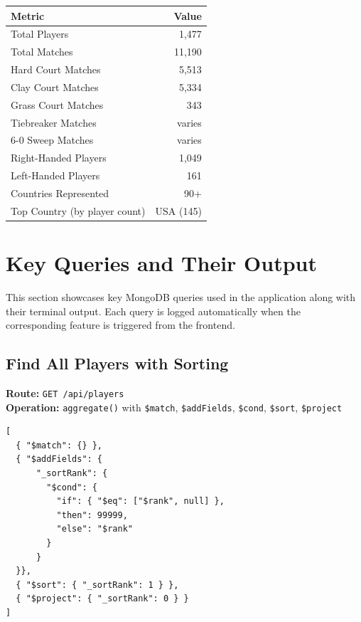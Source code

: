 \documentclass[12pt,a4paper]{article}
\begin{document}
\begin{tabular}{|l|r|}
    \hline
    \textbf{Metric}              & \textbf{Value} \\
    \hline
    Total Players                & 1,477 \\
    \hline
    Total Matches                & 11,190 \\
    \hline
    Hard Court Matches           & 5,513 \\
    \hline
    Clay Court Matches           & 5,334 \\
    \hline
    Grass Court Matches          & 343 \\
    \hline
    Tiebreaker Matches           & varies \\
    \hline
    6-0 Sweep Matches            & varies \\
    \hline
    Right-Handed Players         & 1,049 \\
    \hline
    Left-Handed Players          & 161 \\
    \hline
    Countries Represented        & 90+ \\
    \hline
    Top Country (by player count)& USA (145) \\
    \hline
\end{tabular}


\newpage
\section{Key Queries and Their Output}

This section showcases key MongoDB queries used in the application along with their terminal output. Each query is logged automatically when the corresponding feature is triggered from the frontend.

\subsection{Find All Players with Sorting}
\textbf{Route:} \texttt{GET /api/players} \\
\textbf{Operation:} \texttt{aggregate()} with \texttt{\$match}, \texttt{\$addFields}, \texttt{\$cond}, \texttt{\$sort}, \texttt{\$project}

\begin{lstlisting}[style=codestyle, caption={Player listing aggregation pipeline}]
[
  { "$match": {} },
  { "$addFields": {
      "_sortRank": {
        "$cond": {
          "if": { "$eq": ["$rank", null] },
          "then": 99999,
          "else": "$rank"
        }
      }
  }},
  { "$sort": { "_sortRank": 1 } },
  { "$project": { "_sortRank": 0 } }
]
\end{lstlisting}
\end{document}
